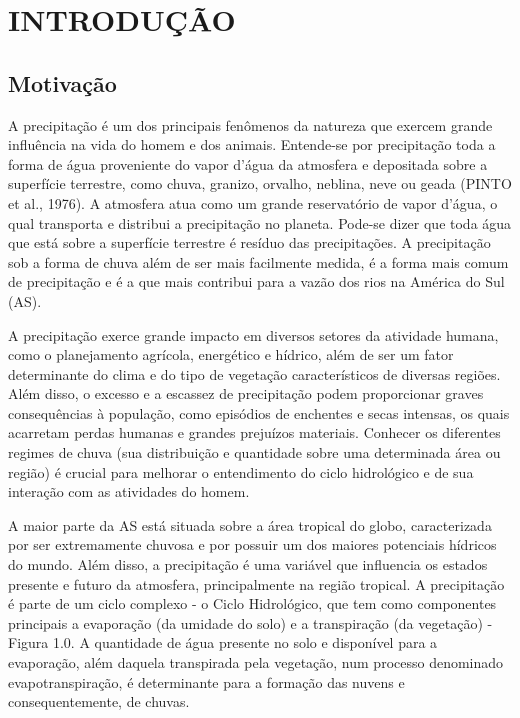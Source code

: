 \hypertarget{estilo:capitulo}{}
\chapter{INTRODUÇÃO} 

\section{Motivação}
\label{ss:motivacao}

A precipitação é um dos principais fenômenos da natureza que exercem grande influência na vida do homem e dos animais. Entende-se por precipitação toda a forma de água proveniente do vapor d'água da atmosfera e depositada sobre a superfície terrestre, como chuva, granizo, orvalho, neblina, neve ou geada (PINTO et al., 1976). A atmosfera atua como um grande reservatório de vapor d'água, o qual transporta e distribui a precipitação no planeta. Pode-se dizer que toda água que está sobre a superfície terrestre é resíduo das precipitações. A precipitação sob a forma de chuva além de ser mais facilmente medida, é a forma mais comum de precipitação e é a que mais contribui para a vazão dos rios na América do Sul (AS). 

A precipitação exerce grande impacto em diversos setores da atividade humana, como o planejamento agrícola, energético e hídrico, além de ser um fator determinante do clima e do tipo de vegetação característicos de diversas regiões. Além disso, o excesso e a escassez de precipitação podem proporcionar graves consequências à população, como episódios de enchentes e secas intensas, os quais acarretam perdas humanas e grandes prejuízos materiais. Conhecer os diferentes regimes de chuva (sua distribuição e quantidade sobre uma determinada área ou região) é crucial para melhorar o entendimento do ciclo hidrológico e de sua interação com as atividades do homem.

A maior parte da AS está situada sobre a área tropical do globo, caracterizada por ser extremamente chuvosa e por possuir um dos maiores potenciais hídricos do mundo. Além disso, a precipitação é uma variável que influencia os estados presente e futuro da atmosfera, principalmente na região tropical. A precipitação é parte de um ciclo complexo - o Ciclo Hidrológico, que tem como componentes principais a evaporação (da umidade do solo) e a transpiração (da vegetação) - Figura 1.0. A quantidade de água presente no solo e disponível para a evaporação, além daquela transpirada pela vegetação, num processo denominado evapotranspiração, é determinante para a formação das nuvens e consequentemente, de chuvas.

